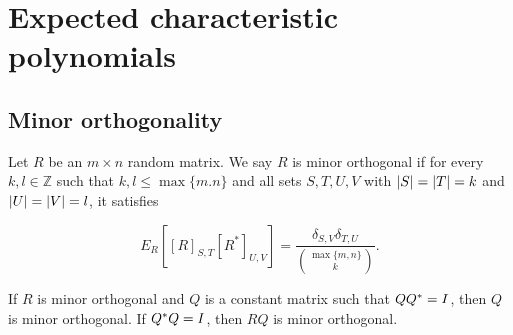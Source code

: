 

\section{Expected characteristic polynomials} \label{sec:minor_orthogonality}

\subsection{Minor orthogonality}

\begin{definition}
    Let $R$ be an $m \times n$ random matrix. We say $R$ is minor orthogonal if for every $k,l \in \mathbb Z$ such that $k,l \le \max\{m.n\}$ and all sets $S,T,U,V$ with $\lvert S \rvert = \lvert T \rvert = k$ and $\lvert U \rvert = \lvert V \rvert = l$, it satisfies
    
    \begin{equation*}
        E_R\left[ [R]_{S,T} [R^*]_{U,V} \right] = \frac{\delta_{S,V}\delta_{T,U}}{\binom{\max\{m,n\}}{k}}.
    \end{equation*}
\end{definition}

\begin{lemma} \label{lemma:orth_trans_is_minorth}
    If $R$ is minor orthogonal and $Q$ is a constant matrix such that $QQ^* = I$, then $Q$ is minor orthogonal. If $Q^*Q = I$, then $RQ$ is minor orthogonal.
\end{lemma}

